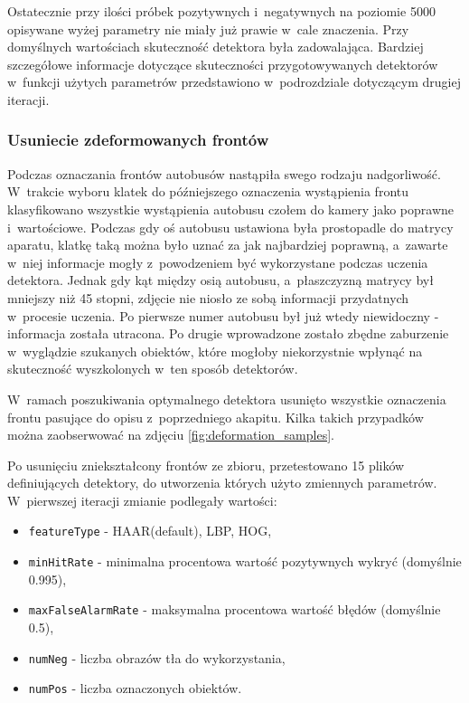 Ostatecznie przy ilości próbek pozytywnych i~negatywnych 
na poziomie 5000 opisywane wyżej parametry nie miały już prawie w~cale
znaczenia. Przy domyślnych wartościach skuteczność detektora była 
zadowalająca. Bardziej szczegółowe informacje dotyczące skuteczności
przygotowywanych detektorów w~funkcji użytych parametrów
przedstawiono w~podrozdziale dotyczącym drugiej iteracji.

\subsubsection{Usuniecie zdeformowanych frontów}

Podczas oznaczania frontów autobusów nastąpiła swego rodzaju
nadgorliwość. W~trakcie wyboru klatek do późniejszego oznaczenia
wystąpienia frontu klasyfikowano wszystkie wystąpienia autobusu
czołem do kamery jako poprawne i~wartościowe. Podczas gdy oś autobusu
ustawiona była prostopadle do matrycy aparatu, klatkę taką można było
uznać za jak najbardziej poprawną, a~zawarte w~niej informacje mogły
z~powodzeniem być wykorzystane podczas uczenia detektora. Jednak
gdy kąt między osią autobusu, a~płaszczyzną matrycy był mniejszy
niż 45 stopni, zdjęcie nie niosło ze sobą informacji przydatnych
w~procesie uczenia. Po pierwsze numer autobusu był już wtedy
niewidoczny - informacja została utracona. Po drugie wprowadzone
zostało zbędne zaburzenie w~wyglądzie szukanych obiektów,
które mogłoby niekorzystnie wpłynąć na skuteczność wyszkolonych
w~ten sposób detektorów.

W~ramach poszukiwania optymalnego detektora
usunięto wszystkie oznaczenia frontu pasujące do opisu
z~poprzedniego akapitu. Kilka takich przypadków można
zaobserwować na zdjęciu \ref{fig:deformation_samples}.


Po usunięciu zniekształcony frontów ze zbioru, przetestowano
15 plików definiujących detektory, do utworzenia
których użyto zmiennych parametrów. W~pierwszej iteracji zmianie podlegały
wartości:

\begin{itemize}
\item \verb|featureType| - HAAR(default), LBP, HOG,
\item \verb|minHitRate| - minimalna procentowa wartość pozytywnych wykryć (domyślnie 0.995),
\item \verb|maxFalseAlarmRate| - maksymalna procentowa wartość błędów (domyślnie 0.5),
\item \verb|numNeg| - liczba obrazów tła do wykorzystania,
\item \verb|numPos| - liczba oznaczonych obiektów.
\end{itemize}

